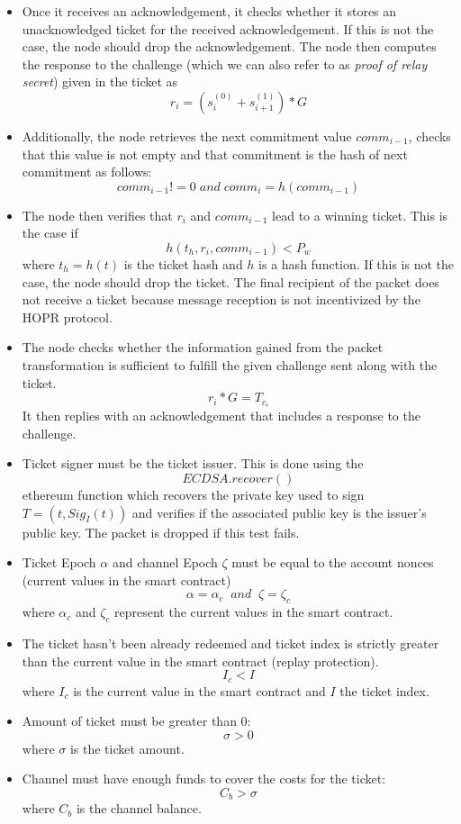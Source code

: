 \begin{itemize}
    \item Once it receives an acknowledgement, it checks whether it stores an unacknowledged ticket for the received acknowledgement.
If this is not the case, the node should drop the acknowledgement.
\newline The node then computes the response to the challenge (which we can also refer to as \textit{proof of relay secret}) given in the ticket as $$r_i=(s_i^{(0)}+s_{i+1}^{(1)})*G$$
\item Additionally, the node retrieves the next commitment value $comm_{i-1}$, checks that this value is not empty and that commitment is the hash of next commitment as follows:
$$ comm_{i-1} != 0 \; and \; comm_{i}=h(comm_{i-1})$$
\item The node then verifies that $r_i$ and $comm_{i-1}$ lead to a winning ticket.
This is the case if $$h(t_h, r_i, comm_{i-1} ) <P_w$$ where $t_h=h(t)$ is the ticket hash and $h$ is a hash function.
If this is not the case, the node should drop the ticket.
The final recipient of the packet does not receive a ticket because message reception is not incentivized by the HOPR protocol.
\item  The node checks whether the information gained from the packet transformation is sufficient to fulfill the given challenge sent along with the ticket. $$r_i*G=T_{c_i}$$
It then replies with an acknowledgement that includes a response to the challenge.
\item Ticket signer must be the ticket issuer. This is done using the $$ECDSA.recover()$$ ethereum function which recovers the private key used to sign $T= (t, Sig_I(t))$ and verifies if the associated public key is the issuer's public key. The packet is dropped if this test fails.
\item Ticket Epoch $\alpha$ and channel Epoch $\zeta$ must be equal to the account nonces (current values in the smart contract) $$\alpha=\alpha_c \;\; and \;\; \zeta=\zeta_c$$
where $\alpha_c$ and $\zeta_c$ represent the current values in the smart contract.
\item The ticket hasn't been already redeemed and ticket index is strictly greater than the current value in the smart contract (replay protection).
     $$I_c <I$$ where $I_c$ is the current value in the smart contract and $I$ the ticket index.
\item Amount of ticket must be greater than 0: $$\sigma>0$$ where $\sigma$ is the ticket amount.

\item Channel must have enough funds to cover the costs for the ticket: $$ C_b>\sigma$$ where $C_b$ is the channel balance.



\end{itemize}
